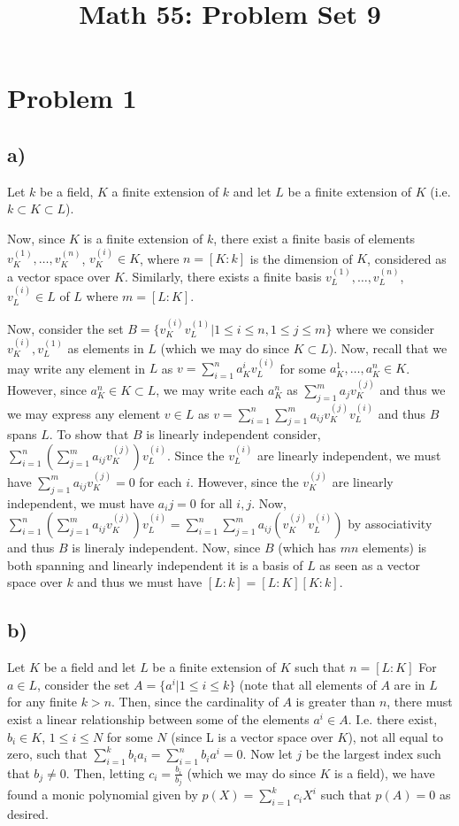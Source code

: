 \title{Math 55: Problem Set 9}

\maketitle
\section*{Problem 1}
\subsection*{a)}
Let $k$ be a field, $K$ a finite extension of $k$ and let $L$ be a finite extension of $K$ (i.e. $k \subset K \subset L$).  \par
Now, since $K$ is a finite extension of $k$, there exist a finite basis of elements $v_K^{(1)},\ldots,v_K^{(n)}$, $v_K^{(i)}\in K$, where $n=[K:k]$ is the dimension of $K$, considered as a vector space over $K$. Similarly, there exists a finite basis $v_L^{(1)},\ldots,v_L^{(n)}$, $v_L^{(i)}\in L$ of $L$ where $m=[L:K]$. \par 
Now, consider the set $B=\{ v_K^{(i)}v_L^{(1)} | 1\leq i\leq n, 1\leq j\leq m\}$ where we consider $v_K^{(i)},v_L^{(1)}$ as elements in $L$ (which we may do since $K\subset L$). Now, recall that we may write any element in $L$ as $v=\sum_{i=1}^n a_K^{i} v_L^{(i)}$ for some $a_K^{1},\ldots,a_K^{n}\in K$. However, since $a_K^{n}\in K\subset L$, we may write each $a_K^{n}$ as $\sum_{j=1}^m a_j v_K^{(j)}$ and thus we we may express any element $v\in L$ as $v=\sum_{i=1}^n \sum_{j=1}^m a_{ij} v_K^{(j)} v_L^{(i)}$ and thus $B$ spans $L$. To show that $B$ is linearly independent consider, $\sum_{i=1}^n \left(\sum_{j=1}^m a_{ij} v_K^{(j)}\right) v_L^{(i)}$. Since the $v_L^{(i)}$ are linearly independent, we must have $\sum_{j=1}^m a_{ij} v_K^{(j)}=0$ for each $i$. However, since the $v_K^{(j)}$ are linearly independent, we must have $a_ij = 0$ for all $i,j$. Now, $\sum_{i=1}^n \left(\sum_{j=1}^m a_{ij} v_K^{(j)}\right) v_L^{(i)}=\sum_{i=1}^n \sum_{j=1}^m a_{ij} \left(v_K^{(j)} v_L^{(i)}\right)$ by associativity and thus $B$ is lineraly independent. Now, since $B$ (which has $mn$ elements) is both spanning and linearly independent it is a basis of $L$ as seen as a vector space over $k$ and thus we must have $[L:k]=[L:K][K:k]$.
\subsection*{b)}
Let $K$ be a field and let $L$ be a finite extension of $K$ such that $n=[L:K]$
For $a\in L$, consider the set $A=\{ a^i | 1\leq i \leq k \}$ (note that all elements of $A$ are in $L$ for any finite $k>n$. Then, since the cardinality of $A$ is greater than $n$, there must exist a linear relationship between some of the elements $a^i\in A$. I.e. there exist, $b_i\in K$, $1\leq i \leq N$ for some $N$ (since L is a vector space over $K$), not all equal to zero, such that $\sum_{i=1}^k b_ia_i = \sum_{i=1}^n b_ia^i=0$. Now let $j$ be the largest index such that $b_j \neq 0$. Then, letting $c_i=\frac{b_i}{b_j}$ (which we may do since $K$ is a field), we have found a monic polynomial given by $p(X)=\sum_{i=1}^k c_iX^i$ such that $p(A)=0$ as desired.
